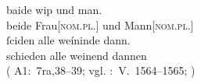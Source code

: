\begin{exe}
\ex \label{ex:konjmixbeide2}
		\gll baide wip und man. \\
			beide Frau[\textsc{nom.pl.\NeutF}] und Mann[\textsc{nom.pl.\MascM}] \\ %
	\sn \gll ſciden alle weíninde dann. \\
			schieden alle weinend dannen \\
		\trans {}
			(%
				A1:~7ra,38--39; vgl.
				\KC:~V.~1564--1565;
				\cite[110]{schroeder1895}%
			)



\end{exe}

